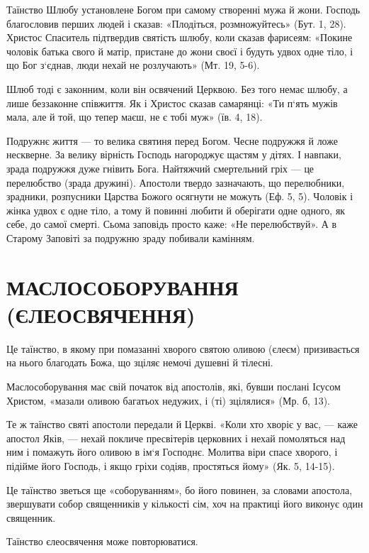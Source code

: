 \documentclass[main.tex]{subfiles}
\begin{document}
Таїнство Шлюбу установлене Богом при самому створенні мужа й жони. Господь благословив перших людей і сказав: «Плодіться, розмножуйтесь» (Бут. 1, 28). Христос Спаситель підтвердив святість шлюбу, коли сказав фарисеям: «Покине чоловік батька свого й матір, пристане до жони своєї і будуть удвох одне тіло, і що Бог з`єднав, люди нехай не розлучають» (Мт. 19, 5-6).

Шлюб тоді є законним, коли він освячений Церквою. Без того немає шлюбу, а лише беззаконне співжиття. Як і Христос сказав самарянці: «Ти п`ять мужів мала, але й той, що тепер маєш, не є тобі муж» (їв. 4, 18).

Подружнє життя — то велика святиня перед Богом. Чесне подружжя й ложе нескверне. За велику вірність Господь нагороджує щастям у дітях. І навпаки, зрада подружжя дуже гнівить Бога. Найтяжчий смертельний гріх — це перелюбство (зрада дружині). Апостоли твердо зазначають, що перелюбники, зрадники, розпусники Царства Божого осягнути не можуть (Еф. 5, 5). Чоловік і жінка удвох є одне тіло, а тому й повинні любити й оберігати одне одного, як себе, до самої смерті. Сьома заповідь просто каже: «Не перелюбствуй». А в Старому Заповіті за подружню зраду побивали камінням.

\section{МАСЛОСОБОРУВАННЯ (ЄЛЕОСВЯЧЕННЯ)}

Це таїнство, в якому при помазанні хворого святою оливою (єлеєм) призивається на нього благодать Божа, що зціляє немочі душевні й тілесні.

Маслособорування має свій початок від апостолів, які, бувши послані Ісусом Христом, «мазали оливою багатьох недужих, і (ті) зцілялися» (Мр. б, 13).

Те ж таїнство святі апостоли передали й Церкві. «Коли хто хворіє у вас, — каже апостол Яків, — нехай покличе пресвітерів церковних і нехай помоляться над ним і помажуть його оливою в ім`я Господнє. Молитва віри спасе хворого, і підійме його Господь, і якщо гріхи содіяв, простяться йому» (Як. 5, 14-15).

Це таїнство зветься ще «соборуванням», бо його повинен, за словами апостола, звершувати собор священників у кількості сім, хоч на практиці його виконує один священник.

Таїнство єлеосвячення може повторюватися.
\end{document}

